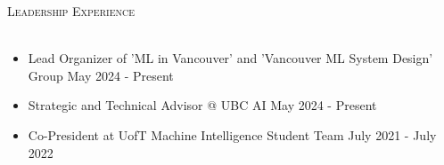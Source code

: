 \documentclass[a4paper]{article}
\newcommand{\lineunder} {
    \vspace*{-8pt} \\
    \hspace*{-18pt} \hrulefill \\
}
\newcommand{\header} [1] {
    {\hspace*{-18pt}\vspace*{6pt} \textsc{#1}}
    \vspace*{-6pt} \lineunder
}
\begin{document}
\vspace{1mm}
\header{Leadership Experience}
\vspace{-3mm}
\begin{itemize} \itemsep 0.5pt
    \item \begin{small} Lead Organizer of 'ML in Vancouver' and 'Vancouver ML System Design' Group \hfill May 2024 - Present \end{small}
	\vspace{-2mm}
    \item \begin{small} Strategic and Technical Advisor @ UBC AI \hfill May 2024 - Present \end{small}
	\vspace{-2mm}
    \item \begin{small} Co-President at UofT Machine Intelligence Student Team \hfill July 2021 - July 2022 \end{small}
	\vspace{-2mm}
\end{itemize}
\end{document}
